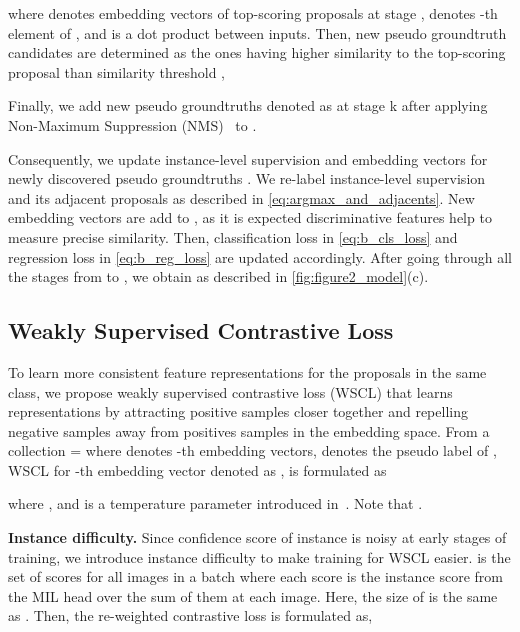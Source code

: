 \documentclass[runningheads]{llncs}
\begin{document}
where  denotes embedding vectors of top-scoring proposals at stage ,  denotes -th element of , and  is a dot product between inputs.
Then, new pseudo groundtruth candidates  are determined as the ones having higher similarity to the top-scoring proposal than similarity threshold , 

Finally, we add new pseudo groundtruths denoted as  at stage k after applying Non-Maximum Suppression (NMS)~\cite{rosenfeld1971edge} to . 












Consequently, we update instance-level supervision and embedding vectors for newly discovered pseudo groundtruths .
We re-label instance-level supervision  and its adjacent proposals as described in \eqref{eq:argmax_and_adjacents}.
New embedding vectors  are add to , as it is expected discriminative features help to measure precise similarity.
Then, classification loss  in \eqref{eq:b_cls_loss} and regression loss  in \eqref{eq:b_reg_loss} are updated accordingly.
After going through all the stages from  to , we obtain  as described in \cref{fig:figure2_model}(c).

\subsection{Weakly Supervised Contrastive Loss}

To learn more consistent feature representations for the proposals in the same class, we propose weakly supervised contrastive loss (WSCL) that learns representations by attracting positive samples closer together and repelling negative samples away from positives samples in the embedding space.
From a collection  =  where  denotes -th embedding vectors,  denotes the pseudo label of , WSCL for -th embedding vector denoted as , is formulated as

where , and  is a temperature parameter introduced in~\cite{khosla2020supervised}.
Note that .


\noindent\textbf{Instance difficulty.}
Since confidence score of instance is noisy at early stages of training, we introduce instance difficulty  to make training for WSCL easier.
 is the set of scores for all images in a batch where each score is the instance score from the MIL head over the sum of them at each image.
Here, the size of  is the same as .
Then, the re-weighted contrastive loss is formulated as,
\end{document}
